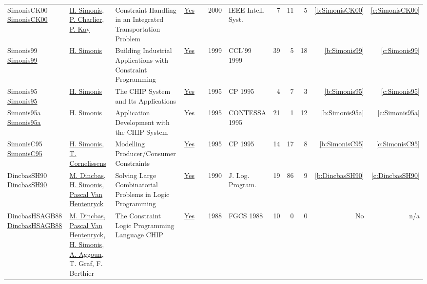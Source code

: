 {\begin{longtable}{>{\raggedright\arraybackslash}p{3cm}>{\raggedright\arraybackslash}p{6cm}>{\raggedright\arraybackslash}p{6.5cm}rrrp{2.5cm}rrrrr}
SimonisCK00 \href{https://doi.org/10.1109/5254.820326}{SimonisCK00} & \hyperref[auth:a17]{H. Simonis}, \hyperref[auth:a901]{P. Charlier}, \hyperref[auth:a902]{P. Kay} & Constraint Handling in an Integrated Transportation Problem & \href{works/SimonisCK00.pdf}{Yes} & \cite{SimonisCK00} & 2000 & {IEEE} Intell. Syst. & 7 & 11 & 5 & \ref{b:SimonisCK00} & \ref{c:SimonisCK00}\\
Simonis99 \href{https://doi.org/10.1007/3-540-45406-3\_6}{Simonis99} & \hyperref[auth:a17]{H. Simonis} & Building Industrial Applications with Constraint Programming & \href{works/Simonis99.pdf}{Yes} & \cite{Simonis99} & 1999 & CCL'99 1999 & 39 & 5 & 18 & \ref{b:Simonis99} & \ref{c:Simonis99}\\
Simonis95 \href{https://doi.org/10.1007/3-540-60299-2\_42}{Simonis95} & \hyperref[auth:a17]{H. Simonis} & The {CHIP} System and Its Applications & \href{works/Simonis95.pdf}{Yes} & \cite{Simonis95} & 1995 & CP 1995 & 4 & 7 & 3 & \ref{b:Simonis95} & \ref{c:Simonis95}\\
Simonis95a \href{https://doi.org/10.1007/3-540-60794-3\_11}{Simonis95a} & \hyperref[auth:a17]{H. Simonis} & Application Development with the {CHIP} System & \href{works/Simonis95a.pdf}{Yes} & \cite{Simonis95a} & 1995 & CONTESSA 1995 & 21 & 1 & 12 & \ref{b:Simonis95a} & \ref{c:Simonis95a}\\
SimonisC95 \href{https://doi.org/10.1007/3-540-60299-2\_27}{SimonisC95} & \hyperref[auth:a17]{H. Simonis}, \hyperref[auth:a306]{T. Cornelissens} & Modelling Producer/Consumer Constraints & \href{works/SimonisC95.pdf}{Yes} & \cite{SimonisC95} & 1995 & CP 1995 & 14 & 17 & 8 & \ref{b:SimonisC95} & \ref{c:SimonisC95}\\
DincbasSH90 \href{https://doi.org/10.1016/0743-1066(90)90052-7}{DincbasSH90} & \hyperref[auth:a726]{M. Dincbas}, \hyperref[auth:a17]{H. Simonis}, \hyperref[auth:a149]{Pascal Van Hentenryck} & Solving Large Combinatorial Problems in Logic Programming & \href{works/DincbasSH90.pdf}{Yes} & \cite{DincbasSH90} & 1990 & J. Log. Program. & 19 & 86 & 9 & \ref{b:DincbasSH90} & \ref{c:DincbasSH90}\\
DincbasHSAGB88 \href{}{DincbasHSAGB88} & \hyperref[auth:a726]{M. Dincbas}, \hyperref[auth:a149]{Pascal Van Hentenryck}, \hyperref[auth:a17]{H. Simonis}, \hyperref[auth:a734]{A. Aggoun}, T. Graf, F. Berthier & The Constraint Logic Programming Language {CHIP} & \href{works/DincbasHSAGB88.pdf}{Yes} & \cite{DincbasHSAGB88} & 1988 & FGCS 1988 & 10 & 0 & 0 & No & n/a\\
\end{longtable}
}

